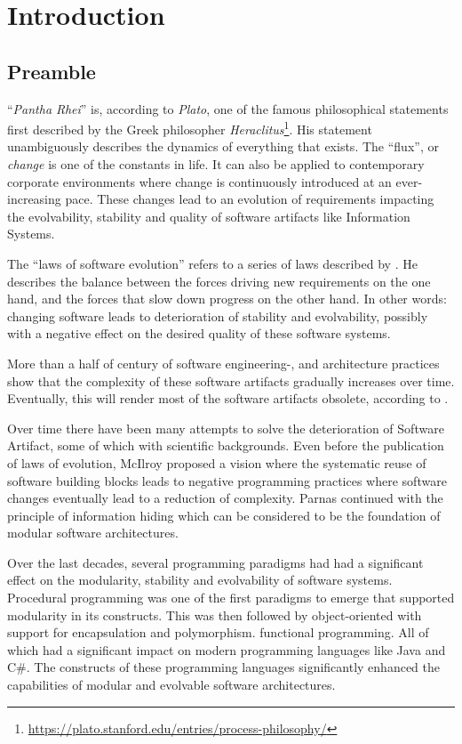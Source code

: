\chapter{Introduction} \label{introduction}

\section{Preamble} \label{sec:preamble}
\enquote{\emph{Pantha Rhei}} is, according to \emph{Plato}, one of the famous
philosophical statements first described by the Greek philosopher
\emph{Heraclitus}\footnote{\url{https://plato.stanford.edu/entries/process-philosophy/}}.
His statement unambiguously describes the dynamics of everything that exists. The
\enquote{flux}, or \emph{change} is one of the constants in life. It can also be applied
to contemporary corporate environments where change is continuously introduced at an
ever-increasing pace. These changes lead to an evolution of requirements impacting the
evolvability, stability and quality of software artifacts like Information Systems.

The \enquote{laws of software evolution} \parencite[]{lehman_programs_1980} refers to a
series of laws described by \citeauthor{lehman_programs_1980}. He describes the balance
between the forces driving new requirements on the one hand, and the forces that slow down
progress on the other hand. In other words: changing software leads to deterioration of
stability and evolvability, possibly with a negative effect on the desired quality
of these software systems. 

More than a half of century of software engineering-, and architecture practices show that
the complexity of these software artifacts gradually increases over time. Eventually, this
will render most of the software artifacts obsolete, according to
\citeauthor{lehman_programs_1980} \parencite[]{lehman_programs_1980}.

Over time there have been many attempts to solve the deterioration of Software Artifact,
some of which with scientific backgrounds. Even before the publication of
\citeauthor{lehman_programs_1980} laws of evolution, McIlroy proposed a vision where the
systematic reuse of software building blocks leads to negative programming practices where
software changes eventually lead to a reduction of complexity. Parnas continued with the
principle of information hiding which can be considered to be the foundation of modular
software architectures.

Over the last decades, several programming paradigms had had a significant effect on the
modularity, stability and evolvability of software systems. Procedural programming was one
of the first paradigms to emerge that supported modularity in its constructs. This was
then followed by object-oriented with support for encapsulation and polymorphism.
functional programming. All of which had a significant impact on modern programming
languages like Java and C\#. The constructs of these programming languages significantly
enhanced the capabilities of modular and evolvable software architectures. 

